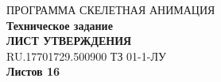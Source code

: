 \newpage
\vspace*{3cm}
\begin{center}
{ПРОГРАММА СКЕЛЕТНАЯ АНИМАЦИЯ} \\
\medskip
{\small\textbf{Техническое задание}} \\
\medskip
{\textbf{ЛИСТ УТВЕРЖДЕНИЯ} \\
\medskip
RU.17701729.500900 ТЗ 01-1-ЛУ} \\
\bigskip
\bigskip
\textbf{Листов 16}
\end{center}
